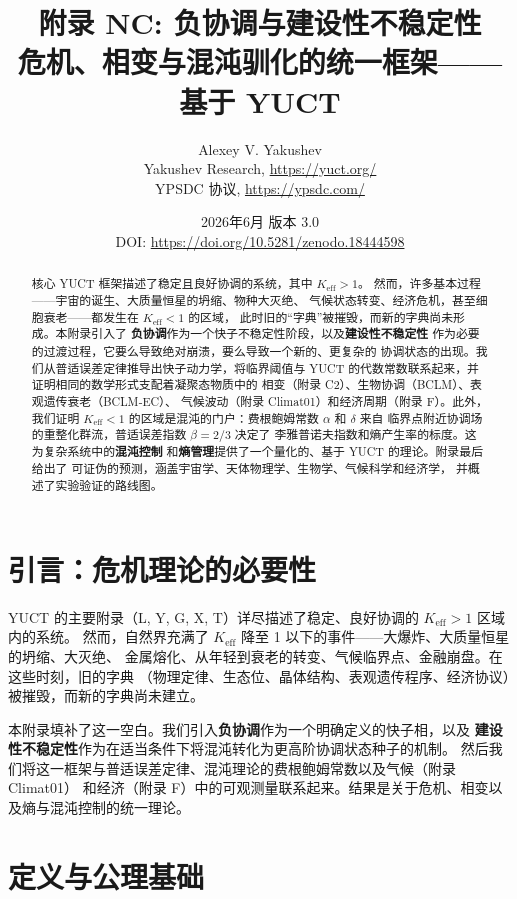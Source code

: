 \documentclass[12pt,a4paper]{article}
\title{\Huge\textbf{附录 NC: 负协调与建设性不稳定性}\\[0.3cm]
	\large 危机、相变与混沌驯化的统一框架——基于 YUCT}
\author{Alexey V. Yakushev \\ 
	Yakushev Research, \url{https://yuct.org/} \\ 
	YPSDC 协议, \url{https://ypsdc.com/}}
\date{2026年6月 \quad 版本 3.0 \\ \medskip
	DOI: \url{https://doi.org/10.5281/zenodo.18444598}}
\newcommand{\Keff}{K_{\mathrm{eff}}}
\begin{document}
	
	\maketitle
	
	\begin{abstract}
		核心 YUCT 框架描述了稳定且良好协调的系统，其中 $\Keff > 1$。
		然而，许多基本过程——宇宙的诞生、大质量恒星的坍缩、物种大灭绝、
		气候状态转变、经济危机，甚至细胞衰老——都发生在 $\Keff < 1$ 的区域，
		此时旧的“字典”被摧毁，而新的字典尚未形成。本附录引入了
		\textbf{负协调}作为一个快子不稳定性阶段，以及\textbf{建设性不稳定性}
		作为必要的过渡过程，它要么导致绝对崩溃，要么导致一个新的、更复杂的
		协调状态的出现。我们从普适误差定律推导出快子动力学，将临界阈值与
		YUCT 的代数常数联系起来，并证明相同的数学形式支配着凝聚态物质中的
		相变（附录 C2）、生物协调（BCLM）、表观遗传衰老（BCLM‑EC）、
		气候波动（附录 Climat01）和经济周期（附录 F）。此外，我们证明
		$\Keff < 1$ 的区域是混沌的门户：费根鲍姆常数 $\alpha$ 和 $\delta$ 来自
		临界点附近协调场的重整化群流，普适误差指数 $\beta = 2/3$ 决定了
		李雅普诺夫指数和熵产生率的标度。这为复杂系统中的\textbf{混沌控制}
		和\textbf{熵管理}提供了一个量化的、基于 YUCT 的理论。附录最后给出了
		可证伪的预测，涵盖宇宙学、天体物理学、生物学、气候科学和经济学，
		并概述了实验验证的路线图。
	\end{abstract}
	
	\tableofcontents
	\newpage
	
	\section{引言：危机理论的必要性}
	
	YUCT 的主要附录（L, Y, G, X, T）详尽描述了稳定、良好协调的 $\Keff > 1$ 区域内的系统。
	然而，自然界充满了 $\Keff$ 降至 1 以下的事件——大爆炸、大质量恒星的坍缩、大灭绝、
	金属熔化、从年轻到衰老的转变、气候临界点、金融崩盘。在这些时刻，旧的字典
	（物理定律、生态位、晶体结构、表观遗传程序、经济协议）被摧毁，而新的字典尚未建立。
	
	本附录填补了这一空白。我们引入\textbf{负协调}作为一个明确定义的快子相，以及
	\textbf{建设性不稳定性}作为在适当条件下将混沌转化为更高阶协调状态种子的机制。
	然后我们将这一框架与普适误差定律、混沌理论的费根鲍姆常数以及气候（附录 Climat01）
	和经济（附录 F）中的可观测量联系起来。结果是关于危机、相变以及熵与混沌控制的统一理论。
	
	\section{定义与公理基础}
	
\end{document}

